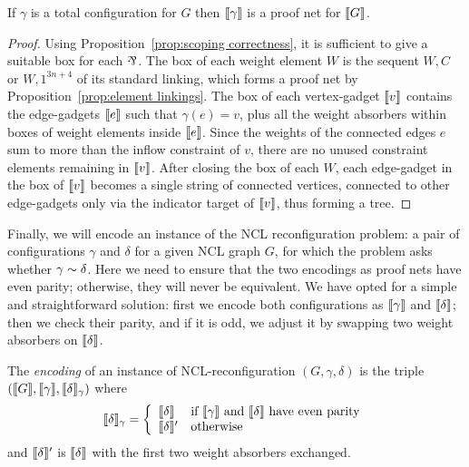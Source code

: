 \documentclass{lmcs}
\begin{document}
\begin{proposition}
If $\gamma$ is a total configuration for $G$ then $\llbracket\gamma\rrbracket$ is a proof net for $\llbracket G\rrbracket$.
\end{proposition}

\begin{proof}
Using Proposition~\ref{prop:scoping correctness}, it is sufficient to give a suitable box for each $\pr$. 
%
The box of each weight element $W$ is the sequent $W,C$ or $W,1^{3n+4}$ of its standard linking, which forms a proof net by Proposition~\ref{prop:element linkings}.
%
The box of each vertex-gadget $\llbracket v\rrbracket$ contains the edge-gadgets $\llbracket e\rrbracket$ such that $\gamma(e)=v$, plus all the weight absorbers within boxes of weight elements inside $\llbracket e\rrbracket$.
%
Since the weights of the connected edges $e$ sum to more than the inflow constraint of $v$, there are no unused constraint elements remaining in $\llbracket v\rrbracket$.
%
After closing the box of each $W$, each edge-gadget in the box of $\llbracket v\rrbracket$ becomes a single string of connected vertices, connected to other edge-gadgets only via the indicator target of $\llbracket v\rrbracket$, thus forming a tree.
\end{proof}


Finally, we will encode an instance of the NCL reconfiguration problem: a pair of configurations $\gamma$ and $\delta$ for a given NCL graph $G$, for which the problem asks whether $\gamma\perm\delta$. Here we need to ensure that the two encodings as proof nets have even parity; otherwise, they will never be equivalent. We have opted for a simple and straightforward solution: first we encode both configurations as $\llbracket\gamma\rrbracket$ and $\llbracket\delta\rrbracket$; then we check their parity, and if it is odd, we adjust it by swapping two weight absorbers on $\llbracket\delta\rrbracket$.



\begin{definition}
%
The \emph{encoding} of an instance of NCL-reconfiguration $(G,\gamma,\delta)$ is the triple $(\llbracket G\rrbracket,\llbracket\gamma\rrbracket,\llbracket\delta\rrbracket_\gamma)$ where
\[
	\llbracket\delta\rrbracket_\gamma=\left\{
	 \begin{array}{ll}\llbracket\delta\rrbracket & \text{if $\llbracket\gamma\rrbracket$ and $\llbracket\delta\rrbracket$ have even parity} \\
	 				  \llbracket\delta\rrbracket' & \text{otherwise}\end{array}\right.
\]
and $\llbracket\delta\rrbracket'$ is $\llbracket\delta\rrbracket$ with the first two weight absorbers exchanged.
\end{definition}
\end{document}
